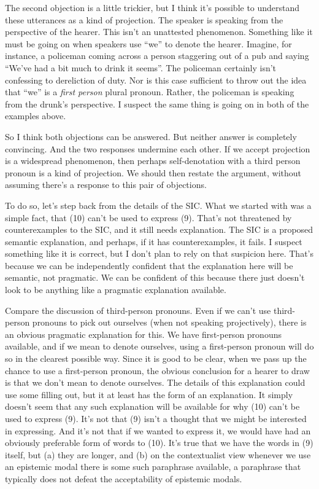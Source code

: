 \documentclass[
  11pt,
  letterpaper,
  DIV=11,
  numbers=noendperiod,
  twoside]{scrartcl}
\begin{document}
The second objection is a little trickier, but I think it's possible to
understand these utterances as a kind of projection. The speaker is
speaking from the perspective of the hearer. This isn't an unattested
phenomenon. Something like it must be going on when speakers use ``we''
to denote the hearer. Imagine, for instance, a policeman coming across a
person staggering out of a pub and saying ``We've had a bit much to
drink it seems''. The policeman certainly isn't confessing to
dereliction of duty. Nor is this case sufficient to throw out the idea
that ``we'' is a \emph{first person} plural pronoun. Rather, the
policeman is speaking from the drunk's perspective. I suspect the same
thing is going on in both of the examples above.

So I think both objections can be answered. But neither answer is
completely convincing. And the two responses undermine each other. If we
accept projection is a widespread phenomenon, then perhaps
self-denotation with a third person pronoun is a kind of projection. We
should then restate the argument, without assuming there's a response to
this pair of objections.

To do so, let's step back from the details of the SIC. What we started
with was a simple fact, that (10) can't be used to express (9). That's
not threatened by counterexamples to the SIC, and it still needs
explanation. The SIC is a proposed semantic explanation, and perhaps, if
it has counterexamples, it fails. I suspect something like it is
correct, but I don't plan to rely on that suspicion here. That's because
we can be independently confident that the explanation here will be
semantic, not pragmatic. We can be confident of this because there just
doesn't look to be anything like a pragmatic explanation available.

Compare the discussion of third-person pronouns. Even if we can't use
third-person pronouns to pick out ourselves (when not speaking
projectively), there is an obvious pragmatic explanation for this. We
have first-person pronouns available, and if we mean to denote
ourselves, using a first-person pronoun will do so in the clearest
possible way. Since it is good to be clear, when we pass up the chance
to use a first-person pronoun, the obvious conclusion for a hearer to
draw is that we don't mean to denote ourselves. The details of this
explanation could use some filling out, but it at least has the form of
an explanation. It simply doesn't seem that any such explanation will be
available for why (10) can't be used to express (9). It's not that (9)
isn't a thought that we might be interested in expressing. And it's not
that if we wanted to express it, we would have had an obviously
preferable form of words to (10). It's true that we have the words in
(9) itself, but (a) they are longer, and (b) on the contextualist view
whenever we use an epistemic modal there is some such paraphrase
available, a paraphrase that typically does not defeat the acceptability
of epistemic modals.
\end{document}
